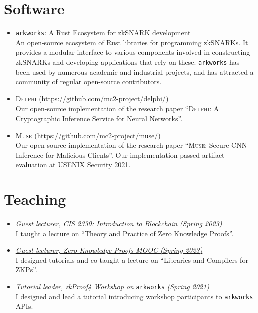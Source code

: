 \documentclass[11pt]{article}
\begin{document}
\begin{cv}{\vspace{-5em}}
  {\section*{Software}}
  \begin{itemize}[itemsep=1em]
    \item[] \href{https://github.com/arkworks-rs}{\texttt{arkworks}}: A Rust Ecosystem for zkSNARK development\\
    An open-source ecosystem of Rust libraries for programming zkSNARKs. It provides a modular interface to various components involved in constructing zkSNARKs and developing applications that rely on these. \texttt{arkworks} has been used by numerous academic and industrial projects, and has attracted a community of regular open-source contributors.

    \item[] \textsc{Delphi} {\footnotesize(\url{https://github.com/mc2-project/delphi/})}\\
      Our open-source implementation of the research paper ``\textsc{Delphi}: {A} Cryptographic Inference Service for Neural Networks''.

    \item[] \textsc{Muse} {\footnotesize(\url{https://github.com/mc2-project/muse/})}\\
      Our open-source implementation of the research paper ``\textsc{Muse}: Secure CNN Inference for Malicious Clients''. Our implementation passed artifact evaluation at USENIX Security 2021.
  \end{itemize}
  
  {\section*{Teaching}}
  \begin{itemize}[itemsep=1em]
    \item[] \emph{Guest lecturer, CIS 2330: Introduction to Blockchain} \emph{(Spring 2023)}\\
      {\small
      I taught a lecture on ``Theory and Practice of Zero Knowledge Proofs''.}

    \item[] \href{https://zk-learning.org/}{\emph{Guest lecturer, Zero Knowledge Proofs MOOC} \emph{(Spring 2023)}}\\
      {\small
      I designed tutorials and co-taught a lecture on ``Libraries and Compilers for ZKPs''.}

    \item[] \href{https://github.com/arkworks-rs/r1cs-tutorial/}{\emph{Tutorial leader, zkProof4 Workshop on} \texttt{arkworks} \emph{(Spring 2021)}}\\
      {\small
      I designed and lead a tutorial introducing workshop participants to \texttt{arkworks} APIs.}


\end{itemize}
\end{cv}
\end{document}
